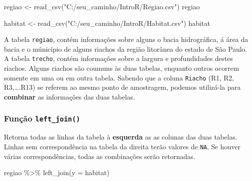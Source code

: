 \documentclass[
]{book}
\newenvironment{Shaded}{\begin{snugshade}}{\end{snugshade}}
\newcommand{\AttributeTok}[1]{\textcolor[rgb]{0.77,0.63,0.00}{#1}}
\newcommand{\FunctionTok}[1]{\textcolor[rgb]{0.00,0.00,0.00}{#1}}
\newcommand{\NormalTok}[1]{#1}
\newcommand{\OtherTok}[1]{\textcolor[rgb]{0.56,0.35,0.01}{#1}}
\newcommand{\SpecialCharTok}[1]{\textcolor[rgb]{0.00,0.00,0.00}{#1}}
\newcommand{\StringTok}[1]{\textcolor[rgb]{0.31,0.60,0.02}{#1}}
\begin{document}
\begin{Shaded}
\begin{Highlighting}[]
\NormalTok{regiao }\OtherTok{\textless{}{-}} \FunctionTok{read\_csv}\NormalTok{(}\StringTok{"C:/seu\_caminho/IntroR/Regiao.csv"}\NormalTok{)}
\NormalTok{regiao}
\end{Highlighting}
\end{Shaded}

\begin{Shaded}
\begin{Highlighting}[]
\NormalTok{habitat }\OtherTok{\textless{}{-}} \FunctionTok{read\_csv}\NormalTok{(}\StringTok{"C:/seu\_caminho/IntroR/Habitat.csv"}\NormalTok{)}
\NormalTok{habitat}
\end{Highlighting}
\end{Shaded}

A tabela \texttt{regiao}, contém informações sobre alguns o bacia hidrográfica, á área da bacia e o múnicípio de alguns riachos da região litorânea do estado de São Paulo. A tabela \texttt{trecho}, contém informações sobre a largura e profundidades destes riachos. Alguns riachos são coumuns às duas tabelas, enquanto outros ocorrem somente em uma ou em outra tabela. Sabendo que a coluna \texttt{Riacho} (R1, R2, R3,\ldots.R13) se referem ao mesmo ponto de amostragem, podemos utilizá-la para \textbf{combinar} as informações das duas tabelas.

\hypertarget{funuxe7uxe3o-left_join}{%
\subsubsection{\texorpdfstring{Função \texttt{left\_join()}}{Função left\_join()}}\label{funuxe7uxe3o-left_join}}

Retorna todas as linhas da tabela à \textbf{esquerda} as as colunas das duas tabelas. Linhas sem correspondência na tabela da direita terão valores de \texttt{NA}. Se houver várias correspondências, todas as combinações serão retornadas.

\begin{Shaded}
\begin{Highlighting}[]
\NormalTok{regiao }\SpecialCharTok{\%\textgreater{}\%} \FunctionTok{left\_join}\NormalTok{(}\AttributeTok{y =}\NormalTok{ habitat)}
\end{Highlighting}
\end{Shaded}
\end{document}
